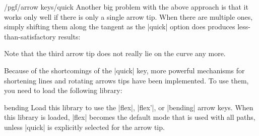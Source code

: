 \begin{key}{/pgf/arrow keys/quick}
    Another big problem with the above approach is that it works only well if
    there is only a single arrow tip. When there are multiple ones, simply
    shifting them along the tangent as the |quick| option does produces
    less-than-satisfactory results:
\begin{codeexample}[]
\end{codeexample}
    Note that the third arrow tip does not really lie on the curve any more.
\end{key}

Because of the shortcomings of the |quick| key, more powerful mechanisms for
shortening lines and rotating arrows tips have been implemented. To use them,
you need to load the following library:

\begin{tikzlibrary}{bending}
    Load this library to use the |flex|, |flex'|, or |bending| arrow keys. When
    this library is loaded, |flex| becomes the default mode that is used with
    all paths, unless |quick| is explicitly selected for the arrow tip.
\end{tikzlibrary}

